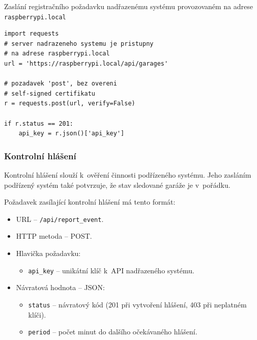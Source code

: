 \begin{listing}[htbp]
\caption{\label{lst:api_reg} Zaslání registračního požadavku nadřazenému systému provozovaném na adrese \texttt{raspberrypi.local}}
\begin{verbatim}
import requests
# server nadrazeneho systemu je pristupny
# na adrese raspberrypi.local
url = 'https://raspberrypi.local/api/garages'

# pozadavek 'post', bez overeni
# self-signed certifikatu
r = requests.post(url, verify=False)

if r.status == 201:
    api_key = r.json()['api_key']
\end{verbatim}
\end{listing}

\subsubsection{Kontrolní hlášení}

Kontrolní hlášení slouží k~ověření činnosti podřízeného systému. Jeho zasláním podřízený systém také potvrzuje, že stav sledované garáže je v~pořádku. 

Požadavek zasílající kontrolní hlášení má tento formát:

\begin{itemize}
    \item URL -- \texttt{/api/report\_event}.
    \item HTTP metoda -- POST.
    \item Hlavička požadavku:
    \begin{itemize}
        \item \texttt{api\_key} -- unikátní klíč k~API nadřazeného systému.
    \end{itemize}
    \item Návratová hodnota -- JSON:
    \begin{itemize}
        \item \texttt{status} -- návratový kód (201 při vytvoření hlášení, 403 při neplatném klíči).
        \item \texttt{period} -- počet minut do dalšího očekávaného hlášení.
    \end{itemize}
\end{itemize}

